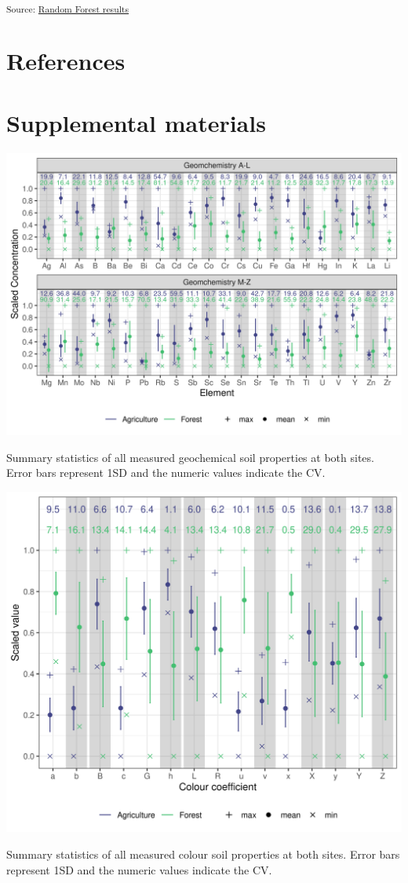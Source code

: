 \documentclass[
  number]{elsarticle}
\begin{document}
\textsubscript{Source:
\href{https://alex-koiter.github.io/spatial-variability-soil-manuscript/notebooks/RF_results.qmd.html\#cell-fig-RF-results}{Random
Forest results}}

\section*{References}\label{references}

\renewcommand{\bibsection}{}


\section*{Supplemental materials}\label{supplemental-materials}

\label{ssuppfig-geo_summary}
\includegraphics{images/geo_summary.png}

Summary statistics of all measured geochemical soil properties at both
sites. Error bars represent 1SD and the numeric values indicate the CV.

\label{ssuppfig-colour_summary}
\includegraphics{images/colour_summary.png}

Summary statistics of all measured colour soil properties at both sites.
Error bars represent 1SD and the numeric values indicate the CV.
\end{document}
